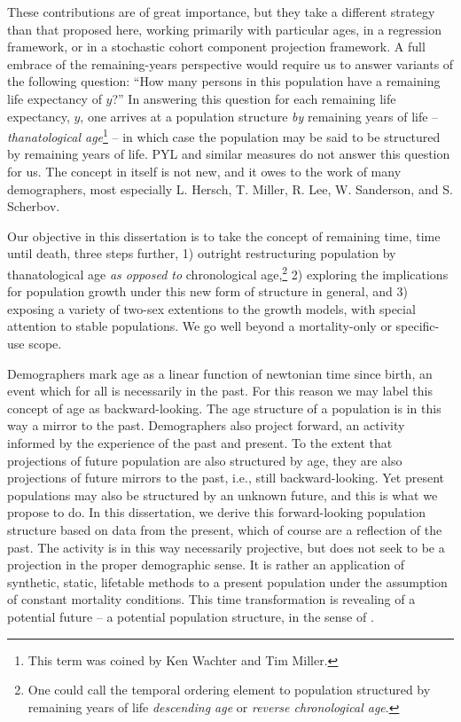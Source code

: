  These contributions are of great importance, but they take a different 
 strategy than that proposed here, working primarily with particular ages, in a 
 regression framework, or in a stochastic cohort component projection framework.
  A full embrace of the remaining-years perspective would require us to answer
  variants of the following question: ``How many persons in this population have
  a remaining life expectancy of $y$?'' In answering this question for each remaining life
 expectancy, $y$, one arrives at a population structure \textit{by} remaining
 years of life -- \textit{thanatological age}\footnote{This term was coined by
 Ken Wachter and Tim Miller.} -- in which case the population may be said to be
 structured by remaining years of life. PYL and similar measures do not 
 answer this question for us. The concept in itself is not new, and it owes to the work of 
 many demographers, most especially L. Hersch, T. Miller, R. Lee, W. Sanderson,
 and S. Scherbov.
 
 Our objective in this dissertation is to take the concept of
 remaining time, time until death, three steps further, 1) outright
 restructuring population by thanatological age \textit{as opposed to}
 chronological age,\footnote{One could call the temporal ordering element to
 population structured by remaining years of life \textit{descending age} or
 \textit{reverse chronological age}.} 2) exploring the implications for
 population growth under this new form of structure in general, and 3) exposing 
 a variety of two-sex extentions to the growth models, with special attention 
 to stable populations. We go well beyond a mortality-only or specific-use scope.

Demographers mark age as a linear function of newtonian time since
birth, an event which for all is necessarily in the past. For this reason we may
label this concept of age as backward-looking. The age structure of a population
is in this way a mirror to the past. Demographers also project forward, an activity 
informed by the experience of the past and present. To the
extent that projections of future population are also structured by age,
they are also projections of future mirrors to the past, i.e., still
backward-looking. Yet present populations may also be structured by an unknown
future, and this is what we propose to do. In this dissertation, we derive
this forward-looking population structure based on data from the present, which of course are a reflection 
of the past. The activity is in this way necessarily projective, but does not 
seek to be a projection in the proper demographic sense. It is rather an
application of synthetic, static, lifetable methods to a present population
under the assumption of constant mortality conditions. This time transformation
is revealing of a potential future -- a potential population structure, in the 
sense of \citet{hersch1944demographie}.

